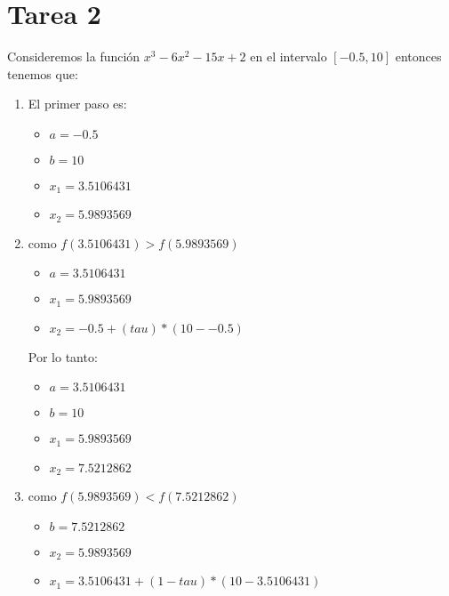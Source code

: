 \documentclass[12pt, fleqn]{article}                            %
\theoremstyle{break}                                            %
\begin{document}
            
    \clearpage
    \section{Tarea 2}

        Consideremos la función $x^3 - 6x^2 - 15x + 2$ en el intervalo $[-0.5, 10]$ entonces tenemos que:
        
        \begin{enumerate}
            \item El primer paso es:
                \begin{itemize}
                    \item $a = -0.5$
                    \item $b = 10$
                    \item $x_1 = 3.5106431$
                    \item $x_2 = 5.9893569$
                \end{itemize}
               
            \item como $f(3.5106431) > f(5.9893569)$

                \begin{itemize}
                    \item $a = 3.5106431$
                    \item $x_1 = 5.9893569$
                    \item $x_2 = -0.5+ (tau) * (10 - -0.5)$
                \end{itemize}

                Por lo tanto:
                \begin{itemize}
                    \item $a = 3.5106431$
                    \item $b = 10$
                    \item $x_1 = 5.9893569$
                    \item $x_2 = 7.5212862$
                \end{itemize}
                
            \item como $f(5.9893569) < f(7.5212862)$
                \begin{itemize}
                    \item $b = 7.5212862$
                    \item $x_2 = 5.9893569$
                    \item $x_1 = 3.5106431+ (1 -tau) * (10 - 3.5106431)$
                \end{itemize}


\end{enumerate}
\end{document}
